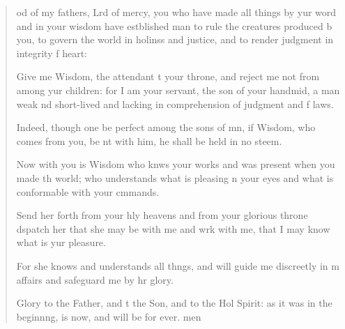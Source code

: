 \begin{verse}
  \begin{patverse}
od of my fathers, Lrd of mercy,
you who have made all things by yur word
and in your wisdom have estblished man
to rule the creatures produced b you,
to govern the world in holinss and justice,
and to render judgment in integrity f heart:

Give me Wisdom, the attendant t your throne,
and reject me not from among yur children:
for I am your servant, the son of your handmid,
a man weak nd short-lived
and lacking in comprehension of judgment and f laws.

Indeed, though one be perfect among the sons of mn,
if Wisdom, who comes from you, be nt with him,
he shall be held in no steem.

Now with you is Wisdom who knws your works
and was present when you made th world;
who understands what is pleasing \pointup{\i}n your eyes
and what is conformable with your cmmands.

Send her forth from your hly heavens
and from your glorious throne d\pointup{\i}spatch her
that she may be with me and wrk with me,
that I may know what is yur pleasure.

For she knows and understands all th\pointup{\i}ngs,
and will guide me discreetly in m affairs
and safeguard me by hr glory.

Glory to the Father, and t the Son,
and to the Hol Spirit:
as it was in the beginn\pointup{\i}ng, is now,
and will be for ever. men
  \end{patverse}
\end{verse}

